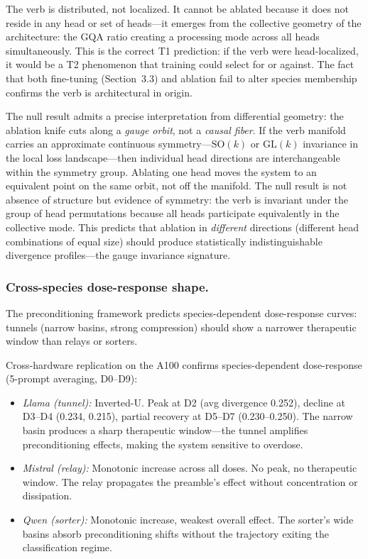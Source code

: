 \documentclass[12pt]{article}
\begin{document}
The verb is distributed, not localized. It cannot be ablated because it does not reside in any head or set of heads---it emerges from the collective geometry of the architecture: the GQA ratio creating a processing mode across all heads simultaneously. This is the correct T1 prediction: if the verb were head-localized, it would be a T2 phenomenon that training could select for or against. The fact that both fine-tuning (Section~3.3) and ablation fail to alter species membership confirms the verb is architectural in origin.

The null result admits a precise interpretation from differential geometry: the ablation knife cuts along a \emph{gauge orbit}, not a \emph{causal fiber}. If the verb manifold carries an approximate continuous symmetry---$\mathrm{SO}(k)$ or $\mathrm{GL}(k)$ invariance in the local loss landscape---then individual head directions are interchangeable within the symmetry group. Ablating one head moves the system to an equivalent point on the same orbit, not off the manifold. The null result is not absence of structure but evidence of symmetry: the verb is invariant under the group of head permutations because all heads participate equivalently in the collective mode. This predicts that ablation in \emph{different} directions (different head combinations of equal size) should produce statistically indistinguishable divergence profiles---the gauge invariance signature.

\subsubsection*{Cross-species dose-response shape.} The preconditioning framework predicts species-dependent dose-response curves: tunnels (narrow basins, strong compression) should show a narrower therapeutic window than relays or sorters.

Cross-hardware replication on the A100 confirms species-dependent dose-response (5-prompt averaging, D0--D9):

\begin{itemize}
\item \emph{Llama (tunnel):} Inverted-U. Peak at D2 (avg divergence 0.252), decline at D3--D4 (0.234, 0.215), partial recovery at D5--D7 (0.230--0.250). The narrow basin produces a sharp therapeutic window---the tunnel amplifies preconditioning effects, making the system sensitive to overdose.

\item \emph{Mistral (relay):} Monotonic increase across all doses. No peak, no therapeutic window. The relay propagates the preamble's effect without concentration or dissipation.

\item \emph{Qwen (sorter):} Monotonic increase, weakest overall effect. The sorter's wide basins absorb preconditioning shifts without the trajectory exiting the classification regime.
\end{itemize}
\end{document}
